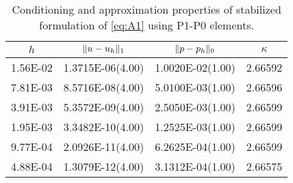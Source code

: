 \begin{table}
  \footnotesize{
    \begin{center}
      \begin{tabular}{c|cc|c}
        \hline
        $h$ & $\lVert{u-u_h}\rVert_1$ & $\lVert{p-p_h}\rVert_0$ & $\kappa$ \\
        \hline
 1.56E-02& 1.3715E-06(4.00)& 1.0020E-02(1.00)& 2.66592  \\
 7.81E-03& 8.5716E-08(4.00)& 5.0100E-03(1.00)& 2.66596  \\
 3.91E-03& 5.3572E-09(4.00)& 2.5050E-03(1.00)& 2.66599  \\
 1.95E-03& 3.3482E-10(4.00)& 1.2525E-03(1.00)& 2.66599  \\
 9.77E-04& 2.0926E-11(4.00)& 6.2625E-04(1.00)& 2.66599  \\
 4.88E-04& 1.3079E-12(4.00)& 3.1312E-04(1.00)& 2.66575  \\
        \hline
      \end{tabular}
    \end{center}
  }
  \caption{Conditioning and approximation properties of stabilized
    formulation of \eqref{eq:A1} using P1-P0 elements.
  }
  \label{tab:A1}
\end{table}

